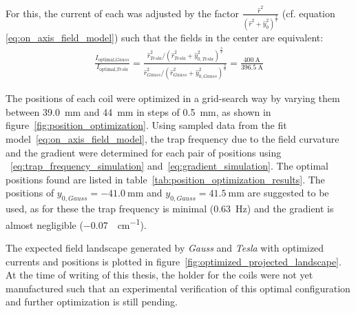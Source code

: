 For this, the current of each was adjusted by the factor $\frac{\hat r^2}{(\hat r^2 + \hat y_0^2)^\frac{3}{2}}$ (cf. equation \eqref{eq:on_axis_field_model}) such that the fields in the center are equivalent:
\begin{align}
    \frac{I_{\text{optimal}, \textit{Gauss}}}{I_{\text{optimal}, \textit{Tesla}}} = \frac{\hat r_\textit{Tesla}^2 / (\hat r_\textit{Tesla}^2 + \hat y_{0, \textit{Tesla}}^2)^\frac{3}{2}}{\hat r_\textit{Gauss}^2 / (\hat r_\textit{Gauss}^2 + \hat y_{0, \textit{Gauss}}^2)^\frac{3}{2}} = \frac{\SI{400}{\ampere}}{\SI{396.5}{\ampere}}
\end{align}

The positions of each coil were optimized in a grid-search way by varying them between \SI{39.0}{\milli\meter} and \SI{44}{\milli\meter} in steps of \SI{0.5}{\milli\meter}, as shown in figure~\ref{fig:position_optimization}. Using sampled data from the fit model~\eqref{eq:on_axis_field_model}, the trap frequency due to the field curvature and the gradient were determined for each pair of positions using ~\eqref{eq:trap_frequency_simulation} and~\eqref{eq:gradient_simulation}.
The optimal positions found are listed in table~\ref{tab:position_optimization_results}. The positions of $y_{0, \textit{Gauss}} = \SI{-41.0}{\milli\meter}$ and $y_{0, \textit{Gauss}} = \SI{41.5}{\milli\meter}$ are suggested to be used, as for these the trap frequency is minimal (\SI{0.63}{\hertz}) and the gradient is almost negligible (\SI{-0.07}{\gauss\per\centi\meter}).

The expected field landscape generated by \textit{Gauss} and \textit{Tesla} with optimized currents and positions is plotted in figure~\ref{fig:optimized_projected_landscape}. At the time of writing of this thesis, the holder for the coils were not yet manufactured such that an experimental verification of this optimal configuration and further optimization is still pending.

